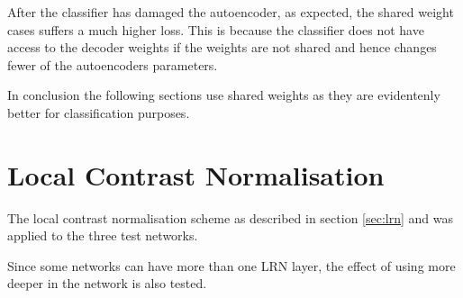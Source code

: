           After the classifier has
          damaged the autoencoder, as expected, the shared weight cases suffers a much higher loss. This is
          because the classifier does not have access to the decoder weights if the weights are not shared and hence
          changes fewer of the autoencoders parameters.

          In conclusion the following sections use shared weights as they are evidentenly better for classification purposes.
        \newpage
        \section{Local Contrast Normalisation}

          The local contrast normalisation scheme
          as described in section \ref{sec:lrn}
          and
          was applied to the three test networks.

          Since some networks can have more than one LRN layer, the effect of
          using more deeper in the network is also tested.

